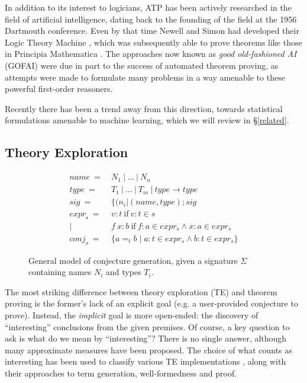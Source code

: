 In addition to its interest to logicians, ATP has been actively researched in the field of artificial intelligence, dating back to the founding of the field at the 1956 Dartmouth conference. Even by that time Newell and Simon had developed their Logic Theory Machine \citep{newell1956logic}, which was subsequently able to prove theorems like those in Principia Mathematica \citep{newell1958elements}. The approaches now known as \emph{good old-fashioned AI} (GOFAI) were due in part to the success of automated theorem proving, as attempts were made to formulate many problems in a way amenable to these powerful first-order reasoners.

Recently there has been a trend away from this direction, towards statistical formulations amenable to machine learning, which we will review in \S \ref{related}.

\subsection{Theory Exploration}
\label{theoryexploration}

\begin{figure}
  \begin{equation*}
    \begin{split}
      name\   =\ & N_1\ |\ \dots\ |\ N_n                               \\
      type\   =\ & T_1\ |\ \dots\ |\ T_m\ |\ type \rightarrow type   \\
      sig\    =\ & \{(n_i | (name, type); sig                                     \\
      expr_{\mathcal{s}}\ =\ & v    : t\ \text{if}\ v : t \in s                        \\
              |\ & f\ x : b\ \text{if}\ f : a \in expr_s \wedge x : a \in expr_s \\
      conj_s\ =\ & \{ a =_t b \mid a : t \in expr_s \wedge b : t \in expr_s \}
    \end{split}
  \end{equation*}

  \caption{General model of \qspec{} conjecture generation, given a signature $\Sigma$ containing names $N_i$ and types $T_i$.}
  \label{coresyntax}
\end{figure}

The most striking difference between theory exploration (TE) and theorem proving is the former's lack of an explicit goal (e.g. a user-provided conjecture to prove). Instead, the \emph{implicit} goal is more open-ended: the discovery of ``interesting'' conclusions from the given premises. Of course, a key question to ask is what do we mean by ``interesting''? There is no single answer, although many approximate measures have been proposed. The choice of what counts as interesting has been used to classify various TE implementations \citep{warburtonscaling}, along with their approaches to term generation, well-formedness and proof.

